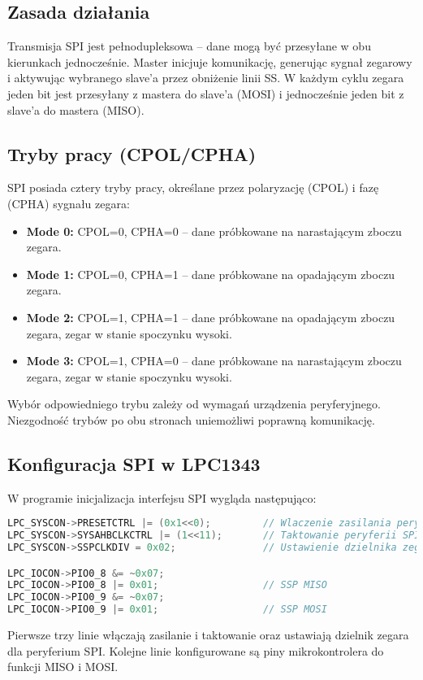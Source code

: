 \documentclass[a4paper,12pt]{report}
\begin{document}
\subsection*{Zasada działania}

Transmisja SPI jest pełnodupleksowa – dane mogą być przesyłane w obu kierunkach jednocześnie. Master inicjuje komunikację, generując sygnał zegarowy i aktywując wybranego slave'a przez obniżenie linii SS. W każdym cyklu zegara jeden bit jest przesyłany z mastera do slave'a (MOSI) i jednocześnie jeden bit z slave'a do mastera (MISO).

\subsection*{Tryby pracy (CPOL/CPHA)}

SPI posiada cztery tryby pracy, określane przez polaryzację (CPOL) i fazę (CPHA) sygnału zegara:
\begin{itemize}
    \item \textbf{Mode 0:} CPOL=0, CPHA=0 – dane próbkowane na narastającym zboczu zegara.
    \item \textbf{Mode 1:} CPOL=0, CPHA=1 – dane próbkowane na opadającym zboczu zegara.
    \item \textbf{Mode 2:} CPOL=1, CPHA=1 – dane próbkowane na opadającym zboczu zegara, zegar w stanie spoczynku wysoki.
    \item \textbf{Mode 3:} CPOL=1, CPHA=0 – dane próbkowane na narastającym zboczu zegara, zegar w stanie spoczynku wysoki.
\end{itemize}

Wybór odpowiedniego trybu zależy od wymagań urządzenia peryferyjnego. Niezgodność trybów po obu stronach uniemożliwi poprawną komunikację.

\subsection*{Konfiguracja SPI w LPC1343}

W programie inicjalizacja interfejsu SPI wygląda następująco:
\begin{lstlisting}[language=C]
LPC_SYSCON->PRESETCTRL |= (0x1<<0);         // Wlaczenie zasilania peryferii SPI
LPC_SYSCON->SYSAHBCLKCTRL |= (1<<11);       // Taktowanie peryferii SPI
LPC_SYSCON->SSPCLKDIV = 0x02;               // Ustawienie dzielnika zegara SPI

LPC_IOCON->PIO0_8 &= ~0x07;
LPC_IOCON->PIO0_8 |= 0x01;                  // SSP MISO
LPC_IOCON->PIO0_9 &= ~0x07;
LPC_IOCON->PIO0_9 |= 0x01;                  // SSP MOSI
\end{lstlisting}
Pierwsze trzy linie włączają zasilanie i taktowanie oraz ustawiają dzielnik zegara dla peryferium SPI. Kolejne linie konfigurowane są piny mikrokontrolera do funkcji MISO i MOSI.
\end{document}
